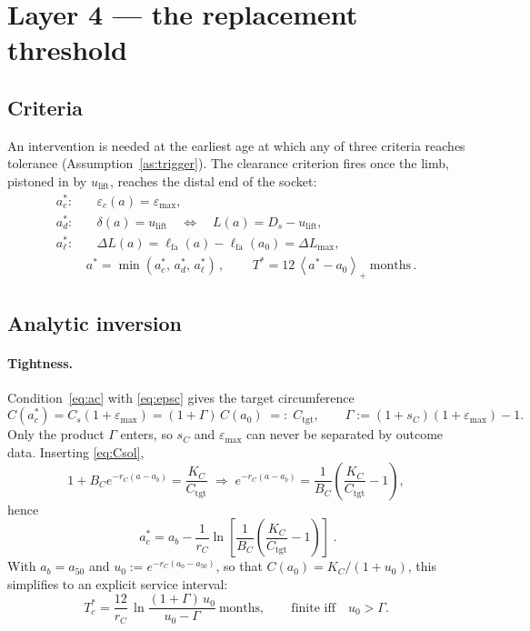 \documentclass[11pt]{article}
\newcommand{\eps}{\varepsilon}
\newcommand{\lift}{u_{\mathrm{lift}}}
\newcommand{\lfa}{\ell_{\mathrm{fa}}}
\newcommand{\tgt}{\mathrm{tgt}}
\newcommand{\pluspart}[1]{\left\langle #1 \right\rangle_{+}}
\theoremstyle{definition}
\begin{document}
\section{Layer 4 --- the replacement threshold}
\label{sec:threshold}

\subsection{Criteria}
An intervention is needed at the earliest age at which any of three criteria reaches tolerance (Assumption~\ref{as:trigger}). The clearance criterion fires once the limb, pistoned in by $\lift$, reaches the distal end of the socket:
\begin{align}
a^*_c:&\quad \eps_c(a)=\eps_{\max}, \label{eq:ac}\\
a^*_d:&\quad \delta(a)=\lift
\quad\Longleftrightarrow\quad L(a)=D_s-\lift , \label{eq:ad}\\
a^*_\ell:&\quad \Delta L(a)=\lfa(a)-\lfa(a_0)=\Delta L_{\max}, \label{eq:aell}\\
&\boxed{\,a^*=\min(a^*_c,\,a^*_d,\,a^*_\ell)\,},\qquad \boxed{\,T^*=12\,\pluspart{a^*-a_0}\ \text{months}\,}. \label{eq:astar}
\end{align}

\subsection{Analytic inversion}
\paragraph{Tightness.} Condition~\eqref{eq:ac} with \eqref{eq:epsc} gives the target circumference
\begin{equation}
C(a^*_c)=C_s(1+\eps_{\max})=(1+\Gamma)\,C(a_0)\;=:\;C_\tgt,
\qquad
\Gamma:=(1+s_C)(1+\eps_{\max})-1 .
\label{eq:Ctgt}
\end{equation}
Only the product $\Gamma$ enters, so $s_C$ and $\eps_{\max}$ can never be separated by outcome data. Inserting \eqref{eq:Csol},
\begin{equation}
1+B_C e^{-r_C(a-a_b)}=\frac{K_C}{C_\tgt}
\;\Rightarrow\;
e^{-r_C(a-a_b)}=\frac{1}{B_C}\!\left(\frac{K_C}{C_\tgt}-1\right),
\end{equation}
hence
\begin{equation}
\boxed{\;a^*_c=a_b-\frac{1}{r_C}\ln\!\left[\frac{1}{B_C}\!\left(\frac{K_C}{C_\tgt}-1\right)\right]\;}.
\label{eq:acsol}
\end{equation}
With $a_b=a_{50}$ and $u_0:=e^{-r_C(a_0-a_{50})}$, so that $C(a_0)=K_C/(1+u_0)$, this simplifies to an explicit service interval:
\begin{equation}
T^*_c=\frac{12}{r_C}\,\ln\!\frac{(1+\Gamma)\,u_0}{u_0-\Gamma}\ \text{months},
\qquad\text{finite iff}\quad u_0>\Gamma .
\label{eq:Tc}
\end{equation}
\end{document}
